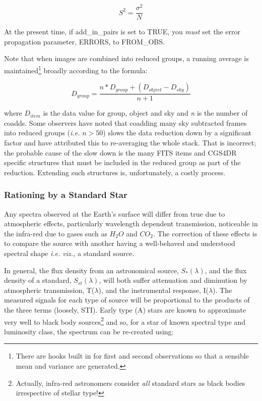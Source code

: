 {\begin{equation}
S^{2} = \frac{\sigma^{2}}{N}
\label{equation_4}
\end{equation}

At the present time, if {\sf add\_in\_pairs} is set to {\sf TRUE}, you 
{\em must} set the error propagation parameter, {\sf ERRORS}, to 
{\sf FROM\_OBS}.

Note that when images are combined into reduced groups, a running average is
maintained\footnote{There are hooks built in for first and second observations
so that a sensible  mean and variance are generated.} broadly according to the 
formula:

\begin{equation}
D_{group} = \frac{n*D_{group} + (D_{object} - D_{sky})}{n+1}
\label{equation_5}
\end{equation}

where $D_{item}$ is the data value for group, object and sky and {\em n} is the 
number of coadds. Some observers have noted that coadding many sky subtracted 
frames into reduced groups ({\em i.e.} $ n > 50 $) slows the data reduction 
down by a significant factor and have attributed this to re-averaging the 
whole stack. That is incorrect; the probable cause of the slow down is the
many FITS items and CGS4DR specific structures that must be included in the
reduced group as part of the reduction. Extending such structures is,
unfortunately, a costly process.

\subsubsection{Rationing by a Standard Star}
\label{ratioing_by_a_standard_source}

Any spectra observed at the Earth's surface will differ from true 
due to atmospheric effects, particularly wavelength dependent transmission,
noticeable in the infra-red due to gases such as $H_{2}O$ and $CO_{2}$.
The correction of these effects is to compare the source with another
having a well-behaved and understood spectral shape {\em i.e. viz.,}  a
standard source. 

In general, the flux density from an astronomical source, $S_{*}(\lambda)$, 
and the flux density of a standard, $S_{st}(\lambda)$, will both suffer 
attenuation and diminution by atmospheric transmission, T($\lambda$), and 
the instrumental response, I($\lambda$). The measured signals for each 
type of source will be proportional to the products of the three terms 
(loosely, STI). Early type (A) stars are known to approximate very well 
to black body sources\footnote{Actually, infra-red astronomers 
consider {\em all} standard stars as black bodies irrespective of 
stellar type!} and so, for a star of known spectral type and 
luminosity class, the spectrum can be re-created using:

}
